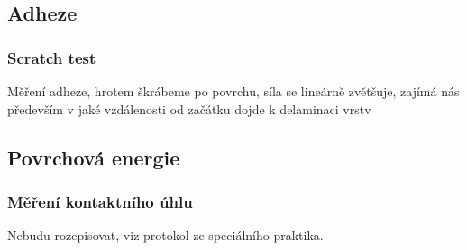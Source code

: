 \documentclass[12pt]{article}
\begin{document}
\subsection{Adheze}
\subsubsection{Scratch test}
Měření adheze, hrotem škrábeme po povrchu, síla se lineárně zvětšuje, zajímá nás především v jaké vzdálenosti od začátku dojde k delaminaci vrstv

\subsection{Povrchová energie}
\subsubsection{Měření kontaktního úhlu}
Nebudu rozepisovat, viz protokol ze speciálního praktika. 
\end{document}
